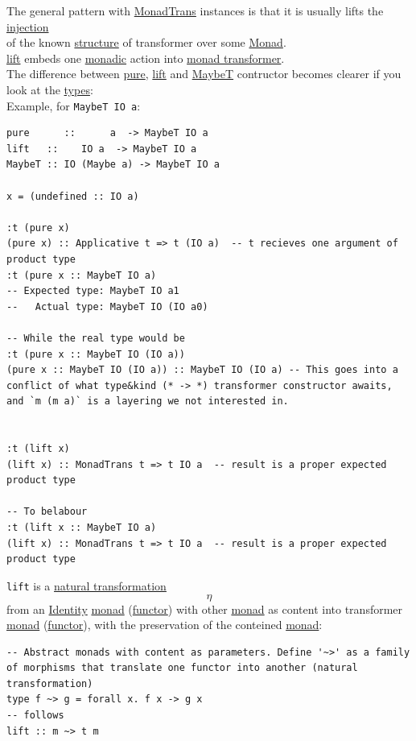 \documentclass[11pt]{article}
\begin{document}
\begin{enumerate}
\begin{enumerate}
The general pattern with \hyperref[orgf4a83bb]{MonadTrans} instances is that it is usually lifts the \hyperref[org2f0080f]{injection}\\
of the known \hyperref[org93ee82c]{structure} of transformer over some \hyperref[org268aaf1]{Monad}.\\

\hyperref[org70ed855]{lift} embeds one \hyperref[org5cc37ea]{monadic} action into \hyperref[orgde9a1fd]{monad transformer}.\\

The difference between \hyperref[org08c21de]{pure}, \hyperref[org70ed855]{lift} and \hyperref[org52bfc7b]{MaybeT} contructor becomes clearer if you look at the \hyperref[org3927fd9]{types}:\\

Example, for \texttt{MaybeT IO a}:\\
\begin{verbatim}
pure      ::      a  -> MaybeT IO a
lift   ::    IO a  -> MaybeT IO a
MaybeT :: IO (Maybe a) -> MaybeT IO a

x = (undefined :: IO a)

:t (pure x)
(pure x) :: Applicative t => t (IO a)  -- t recieves one argument of product type
:t (pure x :: MaybeT IO a)
-- Expected type: MaybeT IO a1
--   Actual type: MaybeT IO (IO a0)

-- While the real type would be
:t (pure x :: MaybeT IO (IO a))
(pure x :: MaybeT IO (IO a)) :: MaybeT IO (IO a) -- This goes into a conflict of what type&kind (* -> *) transformer constructor awaits, and `m (m a)` is a layering we not interested in.


:t (lift x)
(lift x) :: MonadTrans t => t IO a  -- result is a proper expected product type

-- To belabour
:t (lift x :: MaybeT IO a)
(lift x) :: MonadTrans t => t IO a  -- result is a proper expected product type
\end{verbatim}

\texttt{lift} is a \hyperref[org381dd2b]{natural transformation} $$ \eta $$ from an \hyperref[org3bbbadd]{Identity} \hyperref[org268aaf1]{monad} (\hyperref[org6073683]{functor}) with other \hyperref[org268aaf1]{monad} as content into transformer \hyperref[org268aaf1]{monad} (\hyperref[org6073683]{functor}), with the preservation of the conteined \hyperref[org268aaf1]{monad}:\\
\begin{verbatim}
-- Abstract monads with content as parameters. Define '~>' as a family of morphisms that translate one functor into another (natural transformation)
type f ~> g = forall x. f x -> g x
-- follows
lift :: m ~> t m
\end{verbatim}


\end{enumerate}
\end{enumerate}
\end{document}
